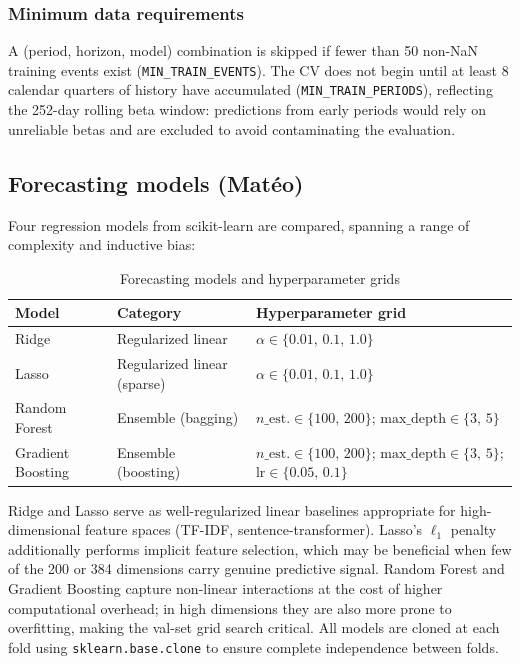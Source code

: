 \documentclass{article}
\begin{document}
\subsubsection{Minimum data requirements}

A (period, horizon, model) combination is skipped if fewer than 50 non-NaN training events exist (\texttt{MIN\_TRAIN\_EVENTS}). The CV does not begin until at least 8 calendar quarters of history have accumulated (\texttt{MIN\_TRAIN\_PERIODS}), reflecting the 252-day rolling beta window: predictions from early periods would rely on unreliable betas and are excluded to avoid contaminating the evaluation.

\subsection{Forecasting models (Matéo)}
\label{sec:models}

Four regression models from scikit-learn are compared, spanning a range of complexity and inductive bias:

\begin{table}[H]
\centering
\caption{Forecasting models and hyperparameter grids}
\label{tab:models}
\begin{tabular}{llp{7.0cm}}
\toprule
\textbf{Model} & \textbf{Category} & \textbf{Hyperparameter grid} \\
\midrule
Ridge        & Regularized linear        & $\alpha \in \{0.01,\, 0.1,\, 1.0\}$ \\[0.3em]
Lasso        & Regularized linear (sparse) & $\alpha \in \{0.01,\, 0.1,\, 1.0\}$ \\[0.3em]
Random Forest    & Ensemble (bagging)    &
  $n\_\text{est.} \in \{100,\,200\}$;\;
  $\text{max\_depth} \in \{3,\,5\}$ \\[0.3em]
Gradient Boosting & Ensemble (boosting) &
  $n\_\text{est.} \in \{100,\,200\}$;\;
  $\text{max\_depth} \in \{3,\,5\}$;\;
  $\text{lr} \in \{0.05,\,0.1\}$ \\
\bottomrule
\end{tabular}
\end{table}

Ridge and Lasso serve as well-regularized linear baselines appropriate for high-dimensional feature spaces (TF-IDF, sentence-transformer). Lasso's $\ell_1$ penalty additionally performs implicit feature selection, which may be beneficial when few of the 200 or 384 dimensions carry genuine predictive signal. Random Forest and Gradient Boosting capture non-linear interactions at the cost of higher computational overhead; in high dimensions they are also more prone to overfitting, making the val-set grid search critical. All models are cloned at each fold using \texttt{sklearn.base.clone} to ensure complete independence between folds.
\end{document}
